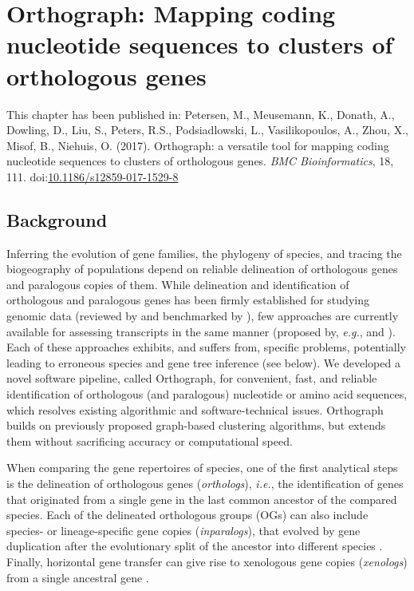 \chapter{Orthograph: Mapping coding nucleotide sequences to clusters of
orthologous genes}
\label{cha:orthograph}


\newpage

This chapter has been published in: Petersen, M., Meusemann, K., Donath, A.,
Dowling, D., Liu, S., Peters, R.S., Podsiadlowski, L., Vasilikopoulos, A.,
Zhou, X., Misof, B., Niehuis, O. (2017). Orthograph: a versatile tool for
mapping coding nucleotide sequences to clusters of orthologous genes. \emph{BMC
Bioinformatics}, 18, 111.
doi:\href{https://dx.doi.org/10.1186/s12859-017-1529-8}{10.1186/s12859-017-1529-8}


\section{Background}\label{background}

Inferring the evolution of gene families, the phylogeny of species, and
tracing the biogeography of populations depend on reliable delineation
of orthologous genes and paralogous copies of them. While delineation
and identification of orthologous and paralogous genes has been firmly
established for studying genomic data (reviewed by \cite{Kristensen2011}
and benchmarked by \cite{Trachana2011}), few approaches are currently
available for assessing transcripts in the same manner (proposed by,
\emph{e.g.}, \cite{Ebersberger2009} and \cite{Schreiber2009}). Each of
these approaches exhibits, and suffers from, specific problems,
potentially leading to erroneous species and gene tree inference (see
below). We developed a novel software pipeline, called Orthograph, for
convenient, fast, and reliable identification of orthologous (and
paralogous) nucleotide or amino acid sequences, which resolves existing
algorithmic and software-technical issues. Orthograph builds on
previously proposed graph-based clustering algorithms, but extends them
without sacrificing accuracy or computational speed.

When comparing the gene repertoires of species, one of the first
analytical steps is the delineation of orthologous genes
(\emph{orthologs}), \emph{i.e.}, the identification of genes that
originated from a single gene in the last common ancestor of the
compared species. Each of the delineated orthologous groups (OGs) can
also include species- or lineage-specific gene copies
(\emph{inparalogs}), that evolved by gene duplication after the
evolutionary split of the ancestor into different species
\cite{Koonin2005}. Finally, horizontal gene transfer can give rise to
xenologous gene copies (\emph{xenologs}) from a single ancestral gene
\cite{Koonin2005}.

